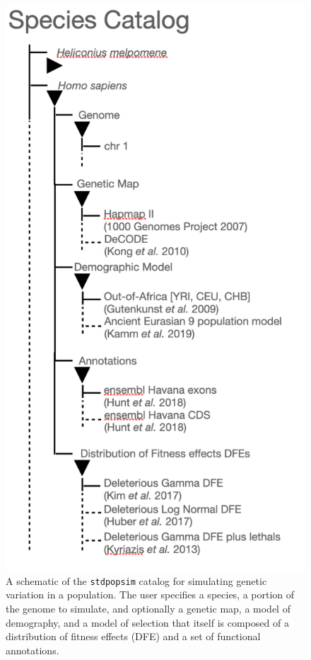 \documentclass[hidelinks]{article}
\newcommand{\stdpopsim}{\texttt{stdpopsim}\xspace}
\begin{document}
    \begin{figure}
        \vspace{-0.0cm}
        \includegraphics[width=\linewidth]{figures/schematics/catalog.pdf}
        \caption{\label{fig:schematic}
        A schematic of the \stdpopsim catalog for simulating genetic variation
        in a population. The user specifies a species, a portion of the genome to simulate,
        and optionally a genetic map, a model of demography, and a model of selection that 
        itself is composed of a distribution of fitness effects (DFE) and a set of functional
        annotations.}
    \end{figure}
\hfill
    
\end{document}
